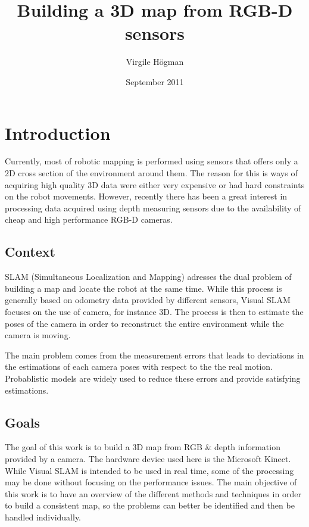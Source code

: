 \documentclass[a4paper,11pt]{kth-mag}
\title{Building a 3D map from RGB-D sensors}
\author{Virgile H\"{o}gman}
\date{September 2011}
\begin{document}
\frontmatter
\maketitle

\clearpage
{}
\clearpage
\tableofcontents
\mainmatter
\chapter{Introduction}

Currently, most of robotic mapping is performed using sensors that offers only a 2D cross section of the environment around them. The reason for this is ways of acquiring high quality 3D data were either very expensive or had hard constraints on the robot movements. However, recently there has been a great interest in processing data acquired using depth measuring sensors due to the availability of cheap and high performance RGB-D cameras. 

\section{Context}

SLAM (Simultaneous Localization and Mapping) adresses the dual problem of building a map and locate the robot at the same time. While this process is generally based on odometry data provided by different sensors, Visual SLAM focuses on the use of camera, for instance 3D. The process is then to estimate the poses of the camera in order to reconstruct the entire environment while the camera is moving.

The main problem comes from the measurement errors that leads to deviations in the estimations of each camera poses with respect to the the real motion. Probablistic models are widely used to reduce these errors and provide satisfying estimations.

\section{Goals}

The goal of this work is to build a 3D map from RGB \& depth information provided by a camera. The hardware device used here is the Microsoft Kinect. While Visual SLAM is intended to be used in real time, some of the processing may be done without focusing on the performance issues. The main objective of this work is to have an overview of the different methods and techniques in order to build a consistent map, so the problems can better be identified and then be handled individually.
\end{document}
